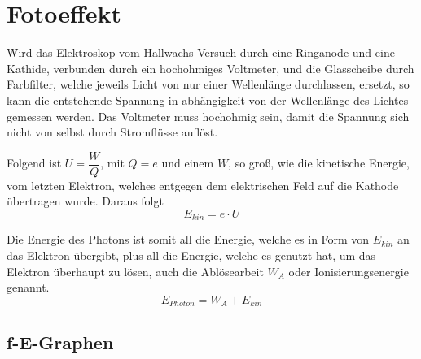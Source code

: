 \documentclass{article}
\begin{document}
\section{Fotoeffekt}
Wird das Elektroskop vom \hyperref[Der Hallswachs-Versuch]{Hallwachs-Versuch} durch eine Ringanode und eine Kathide, verbunden durch ein hochohmiges Voltmeter, und die Glasscheibe durch Farbfilter, welche jeweils Licht von nur einer Wellenlänge durchlassen, ersetzt, so kann die entstehende Spannung in abhängigkeit von der Wellenlänge des Lichtes gemessen werden. Das Voltmeter muss hochohmig sein, damit die Spannung sich nicht von selbst durch Stromflüsse auflöst.
 
Folgend ist $U = \dfrac{W}{Q}$, mit $Q=e$ und einem $W$, so groß, wie die kinetische Energie, vom letzten Elektron, welches entgegen dem elektrischen Feld auf die Kathode übertragen wurde. Daraus folgt
\[
 E_{kin} = e \cdot U
\] 
 
Die Energie des Photons ist somit all die Energie, welche es in Form von $E_{kin}$ an das Elektron übergibt, plus all die Energie, welche es genutzt hat, um das Elektron überhaupt zu lösen, auch die Ablösearbeit $W_A$ oder Ionisierungsenergie genannt.
\[
 E_{Photon} = W_A + E_{kin} 
\] 
 
\subsection{f-E-Graphen} 
\end{document}
